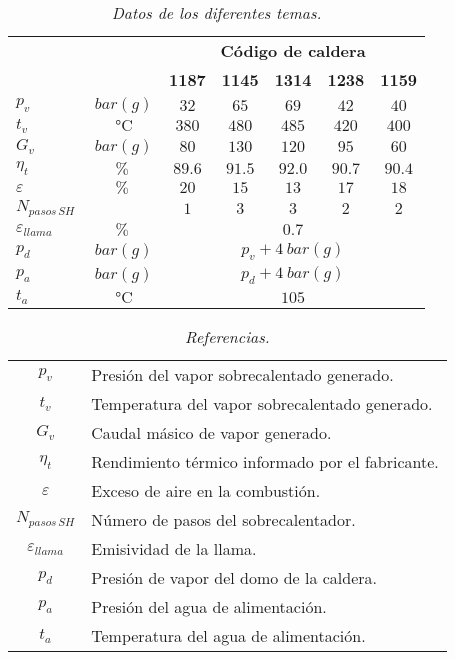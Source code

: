 \begin{table}[ht]
\centering
\begin{tabular}[t]{lcccccc}
\toprule
&&\multicolumn{5}{c}{\textbf{Código de caldera}}\\
&&\textbf{1187} & \textbf{1145} & \textbf{1314} &  \textbf{1238} & \textbf{1159}\\
\midrule
$p_v$&$\SI{}{bar(g)}$&$32$&$65$&$69$&$42$&$40$\\
$t_v$&$\SI{}{\celsius}$&$380$&$480$&$485$&$420$&$400$\\
$G_v$&$\SI{}{bar(g)}$&$80$&$130$&$120$&$95$&$60$\\
$\eta_t$&$\%$&$89.6$&$91.5$&$92.0$&$90.7$&$90.4$\\
$\varepsilon$&$\%$&$20$&$15$&$13$&$17$&$18$\\
$N_{pasos\,SH}$&&$1$&$3$&$3$&$2$&$2$\\
$\varepsilon_{llama}$&$\%$&\multicolumn{5}{c}{$0.7$}\\
$p_d$&$\SI{}{bar(g)}$&\multicolumn{5}{c}{$p_v + \SI{4}{bar(g)}$}\\
$p_a$&$\SI{}{bar(g)}$&\multicolumn{5}{c}{$p_d + \SI{4}{bar(g)}$}\\
$t_a$&$\SI{}{\celsius}$&\multicolumn{5}{c}{$105$}\\
\bottomrule
\end{tabular}
\caption{\textit{Datos de los diferentes temas.}}
\label{tab:Datos}
\end{table}

\begin{table}[ht]
\centering
\begin{tabular}[t]{cl}
\toprule
$p_v$&Presión del vapor sobrecalentado generado.\\
$t_v$&Temperatura del vapor sobrecalentado generado.\\
$G_v$&Caudal másico de vapor generado.\\
$\eta_t$&Rendimiento térmico informado por el fabricante.\\
$\varepsilon$&Exceso de aire en la combustión.\\
$N_{pasos\,SH}$&Número de pasos del sobrecalentador.\\
$\varepsilon_{llama}$&Emisividad de la llama.\\
$p_d$&Presión de vapor del domo de la caldera.\\
$p_a$&Presión del agua de alimentación.\\
$t_a$&Temperatura del agua de alimentación.\\
\bottomrule
\end{tabular}
\caption{\textit{Referencias.}}
\label{tab:Referencias}
\end{table}




